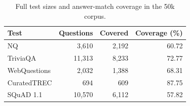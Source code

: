 \begin{table}[t]
\caption{Full test sizes and answer-match coverage in the 50k corpus.}
\label{tab:datasets}
\centering
\footnotesize
\begin{tabular}{lrrr}
\toprule
Test & Questions & Covered & Coverage (\%) \\
\midrule
NQ & 3,610 & 2,192 & 60.72 \\
TriviaQA & 11,313 & 8,233 & 72.77 \\
WebQuestions & 2,032 & 1,388 & 68.31 \\
CuratedTREC & 694 & 609 & 87.75 \\
SQuAD 1.1 & 10,570 & 6,112 & 57.82 \\
\bottomrule
\end{tabular}
\end{table}
